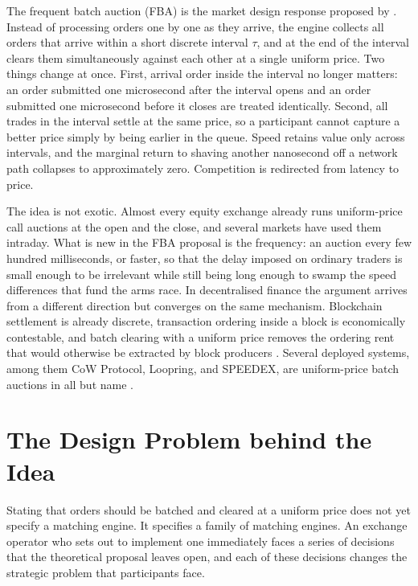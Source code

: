The frequent batch auction (FBA) is the market design response proposed
by \citet{budish2015hft}. Instead of processing orders one by one as they
arrive, the engine collects all orders that arrive within a short
discrete interval $\tau$, and at the end of the interval clears them
simultaneously against each other at a single uniform price. Two things
change at once. First, arrival order inside the interval no longer
matters: an order submitted one microsecond after the interval opens and
an order submitted one microsecond before it closes are treated
identically. Second, all trades in the interval settle at the same
price, so a participant cannot capture a better price simply by being
earlier in the queue. Speed retains value only across intervals, and the
marginal return to shaving another nanosecond off a network path
collapses to approximately zero. Competition is redirected from latency
to price.

The idea is not exotic. Almost every equity exchange already runs
uniform-price call auctions at the open and the close, and several
markets have used them intraday. What is new in the FBA proposal is the
frequency: an auction every few hundred milliseconds, or faster, so that
the delay imposed on ordinary traders is small enough to be irrelevant
while still being long enough to swamp the speed differences that fund
the arms race. In decentralised finance the argument arrives from a
different direction but converges on the same mechanism. Blockchain
settlement is already discrete, transaction ordering inside a block is
economically contestable, and batch clearing with a uniform price
removes the ordering rent that would otherwise be extracted by block
producers \citep{gong2023fbadex,walther2021multitoken}. Several deployed
systems, among them CoW Protocol, Loopring, and SPEEDEX, are
uniform-price batch auctions in all but name
\citep{dutta2025cow,wang2018loopring,ramsay2023speedex}.

\section{The Design Problem behind the Idea}
\label{sec:designproblem}

Stating that orders should be batched and cleared at a uniform price
does not yet specify a matching engine. It specifies a family of
matching engines. An exchange operator who sets out to implement one
immediately faces a series of decisions that the theoretical proposal
leaves open, and each of these decisions changes the strategic problem
that participants face.

